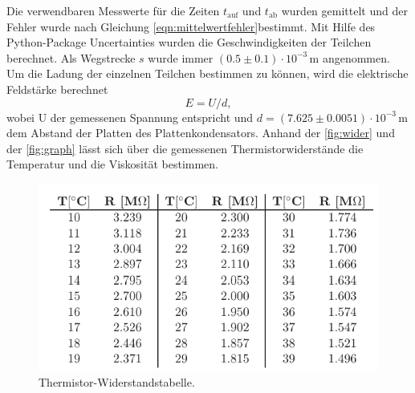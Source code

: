 \begin{table}[H]
	\centering
	\captionsetup{width=0.95\linewidth}
	\caption{Ergebnisse für 17. Tröpfchen. Felder entsprechen jeweils primären, sekundären und tertiären Messgrößen. Hervorgehoben
			 ist der Mittelwert der Laufzeiten. Relative Abweichung zur Bedingung an Geschwindigkeit: $\protect$.}
	
	\label{tab:tropfen_17}
\end{table}

Die verwendbaren Messwerte für die Zeiten $t_{\text{auf}}$ und $t_{\text{ab}}$ wurden gemittelt und der Fehler wurde nach
Gleichung \eqref{eqn:mittelwertfehler}bestimmt. Mit Hilfe des Python-Package Uncertainties \cite{uncertainties} wurden die Geschwindigkeiten der 
Teilchen berechnet. Als Wegstrecke $s$ wurde immer $(0.5 \pm 0.1) \cdot 10^{-3} \, \mathrm{m} $ angenommen. Um die Ladung der 
einzelnen Teilchen bestimmen zu können, wird die elektrische Feldstärke berechnet
\begin{equation*} 
    E = U/d,
\end{equation*}
wobei U der gemessenen Spannung entspricht und $d = (7.625 \pm 0.0051) \cdot 10^{-3}\,\mathrm{m} $ dem Abstand der Platten des Plattenkondensators.
Anhand der \autoref{fig:wider} und der \autoref{fig:graph} lässt sich über die gemessenen Thermistorwiderstände die Temperatur und die Viskosität bestimmen.

\begin{figure}[H]
    \centering
	\includegraphics[width=0.75\linewidth]{content/grafik/widerstand.png}
	\captionsetup{width=0.925\linewidth}
	\caption{Thermistor-Widerstandstabelle.\cite{millikan}}
	\label{fig:wider}
\end{figure}

